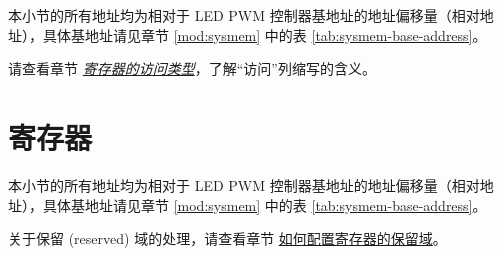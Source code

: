 \documentclass[main\_\_CN.tex]{subfiles}
\begin{document}
本小节的所有地址均为相对于 LED PWM 控制器基地址的地址偏移量（相对地址），具体基地址请见章节 \ref{mod:sysmem} \textit{} 中的表 \ref{tab:sysmem-base-address}。

请查看章节 \hyperref[glossary-access-types]{\textit{寄存器的访问类型}}，了解“访问”列缩写的含义。






\newpage
\section{寄存器}
\label{sec:ledc-reg-field}

本小节的所有地址均为相对于 LED PWM 控制器基地址的地址偏移量（相对地址），具体基地址请见章节 \ref{mod:sysmem} \textit{} 中的表 \ref{tab:sysmem-base-address}。

关于保留 (reserved) 域的处理，请查看章节 \hyperref[programming-reserved-field]{如何配置寄存器的保留域}。


\end{document}
